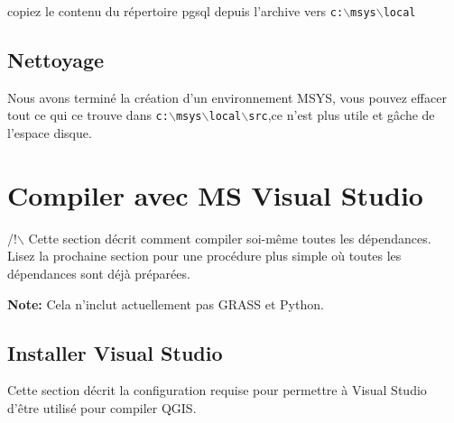 copiez le contenu du répertoire pgsql depuis l'archive vers \texttt{c:$\backslash$msys$\backslash$local}


\subsection{Nettoyage}
Nous avons terminé la création d'un environnement MSYS, vous pouvez effacer tout ce qui ce trouve dans \texttt{c:$\backslash$msys$\backslash$local$\backslash$src},ce n'est plus utile et gâche de l'espace disque.

% 

\section{Compiler avec MS Visual Studio}
/!$\backslash$ Cette section décrit comment compiler soi-même toutes les dépendances. Lisez la prochaine section pour une procédure plus simple où toutes les dépendances sont déjà préparées.

\textbf{Note:} Cela n'inclut actuellement pas GRASS et Python.


\subsection{Installer Visual Studio}
Cette section décrit la configuration requise pour permettre à Visual Studio d'être utilisé pour compiler QGIS. 

